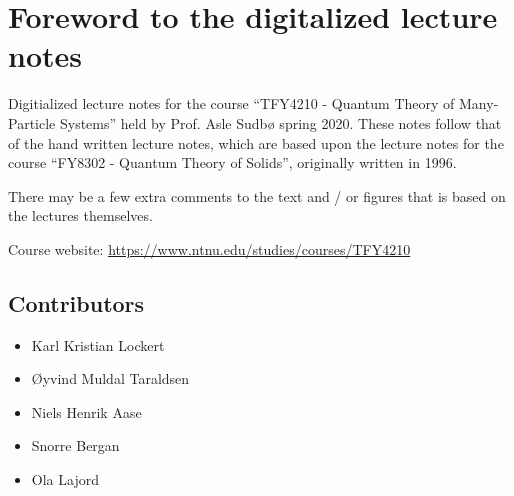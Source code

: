 \section*{Foreword to the digitalized lecture notes}

Digitialized lecture notes for the course ``TFY4210 - Quantum Theory of Many-Particle Systems'' held by Prof. Asle Sudbø spring 2020. These notes follow that of the hand written lecture notes, which are based upon the lecture notes for the course ``FY8302 - Quantum Theory of Solids'', originally written in 1996. 

There may be a few extra comments to the text and / or figures that is based on the lectures themselves. 


Course website: \href{https://www.ntnu.edu/studies/courses/TFY4210}{https://www.ntnu.edu/studies/courses/TFY4210}



\subsection*{Contributors}
	\begin{multicols}{2}
\begin{itemize} 
	\item Karl Kristian Lockert
	\item Øyvind Muldal Taraldsen
	\item Niels Henrik Aase
	\item Snorre Bergan
	\item Ola Lajord
\end{itemize}
\end{multicols}


